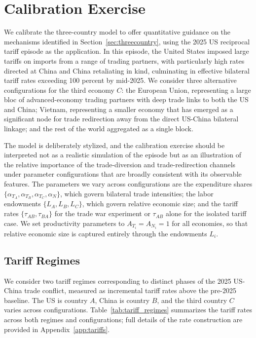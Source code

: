 \documentclass[11pt]{article}
\theoremstyle{plain}
\theoremstyle{remark}
\numberwithin{lemma}{section}
\numberwithin{proposition}{section}
\numberwithin{corollary}{section}
\begin{document}
\section{Calibration Exercise}
\label{sec:calibration}

We calibrate the three-country model to offer quantitative guidance on the mechanisms identified in Section~\ref{sec:threecountry}, using the 2025 US reciprocal tariff episode as the application. In this episode, the United States imposed large tariffs on imports from a range of trading partners, with particularly high rates directed at China and China retaliating in kind, culminating in effective bilateral tariff rates exceeding 100 percent by mid-2025. We consider three alternative configurations for the third economy $C$: the European Union, representing a large bloc of advanced-economy trading partners with deep trade links to both the US and China; Vietnam, representing a smaller economy that has emerged as a significant node for trade redirection away from the direct US-China bilateral linkage; and the rest of the world aggregated as a single block.

The model is deliberately stylized, and the calibration exercise should be interpreted not as a realistic simulation of the episode but as an illustration of the relative importance of the trade-diversion and trade-redirection channels under parameter configurations that are broadly consistent with its observable features. The parameters we vary across configurations are the expenditure shares $\{\alpha_{T_A}, \alpha_{T_B}, \alpha_{T_C}, \alpha_N\}$, which govern bilateral trade intensities; the labor endowments $\{L_A, L_B, L_C\}$, which govern relative economic size; and the tariff rates $\{\tau_{AB}, \tau_{BA}\}$ for the trade war experiment or $\tau_{AB}$ alone for the isolated tariff case. We set productivity parameters to $A_{T_i} = A_{N_i} = 1$ for all economies, so that relative economic size is captured entirely through the endowments $L_i$.


\subsection{Tariff Regimes}
We consider two tariff regimes corresponding to distinct phases of the 2025 US-China trade conflict, measured as incremental tariff rates above the pre-2025 baseline. The US is country $A$, China is country $B$, and the third country $C$ varies across configurations. Table~\ref{tab:tariff_regimes} summarizes the tariff rates across both regimes and configurations; full details of the rate construction are provided in Appendix~\ref{app:tariffs}.
\end{document}
